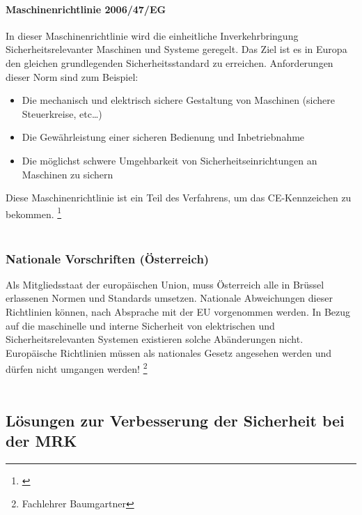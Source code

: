 \documentclass[titlepage,12pt,twoside]{article}
\begin{document}
\paragraph{Maschinenrichtlinie 2006/47/EG}
\hfill \break
\hfill \break
In dieser Maschinenrichtlinie wird die einheitliche Inverkehrbringung 
Sicherheitsrelevanter Maschinen und Systeme geregelt. Das Ziel ist es in Europa 
den gleichen grundlegenden Sicherheitsstandard zu erreichen. Anforderungen dieser 
Norm sind zum Beispiel: \\
\begin{itemize}
	\item Die mechanisch und elektrisch sichere Gestaltung von Maschinen (sichere Steuerkreise, etc…)
	\item Die Gewährleistung einer sicheren Bedienung und Inbetriebnahme
	\item Die möglichst schwere Umgehbarkeit von Sicherheitseinrichtungen an Maschinen zu sichern
\end{itemize}
\hfill \break
Diese Maschinenrichtlinie ist ein Teil des Verfahrens, um das CE-Kennzeichen zu 
bekommen. \footnote{\cite{TÜVsüd}}\\
\\
\subsubsection{Nationale Vorschriften (Österreich)}
Als Mitgliedsstaat der europäischen Union, muss Österreich alle in Brüssel 
erlassenen Normen und Standards umsetzen. Nationale Abweichungen dieser Richtlinien 
können, nach Absprache mit der EU vorgenommen werden. In Bezug auf die maschinelle 
und interne Sicherheit von elektrischen und Sicherheitsrelevanten Systemen existieren 
solche Abänderungen nicht. \\
Europäische Richtlinien müssen als nationales Gesetz angesehen werden und dürfen 
nicht umgangen werden! \footnote{Fachlehrer Baumgartner} \\
\\
\subsection{Lösungen zur Verbesserung der Sicherheit bei der MRK}
\label{chap:Lösungen zur Verbesserung der Sicherheit bei der MRK}
\end{document}
